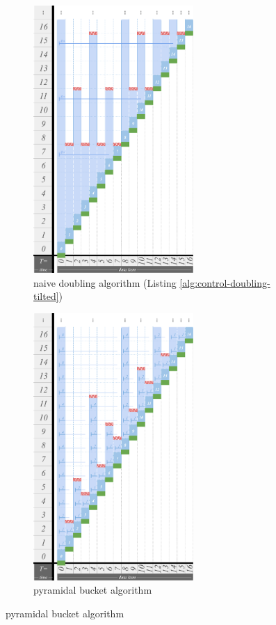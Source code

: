\begin{figure}
\begin{subfigure}{0.36\linewidth}
\centering
\includegraphics[height=4in]{img/surface-control-tall-zhao-tilted-doubling-naive}
\centering
\caption{naive doubling algorithm (Listing \ref{alg:control-doubling-tilted})}
\label{fig:surface-control-tilted:naive-doubling}
\end{subfigure}%
\begin{subfigure}{0.32\linewidth}
\centering
\includegraphics[height=4in,trim={2.5cm 0 0 0},clip]{img/surface-control-tall-zhao}
\centering
\caption{pyramidal bucket algorithm \citep{zhao2005generalized}}
\label{fig:surface-control-tilted:pyrimidal}

\end{subfigure}
\end{figure}
